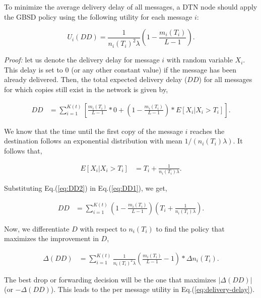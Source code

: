 \begin{theorem} \label{th:delivery-delay}
To minimize the average delivery delay of all messages, a DTN node should apply the GBSD policy using the following utility for each message $i$:

\begin{equation}\label{eq:delivery-delay}
U_{i}(DD) = \frac{1}{n_i(T_i)^2 \lambda} ( 1-\frac{m_i(T_i)}{L-1}). \end{equation}
\end{theorem}

\emph{Proof:} let us denote the delivery delay for message $i$ with random variable $X_i$. This delay is set to $0$ (or any other constant value) if the message has been already delivered. Then, the total expected delivery delay ($DD$) for all messages for which copies still exist in the network is given by,

\small
\begin{align}\label{eq:DD1}
DD & = \sum_{i=1}^{K(t)} \left[\frac{m_i(T_i)}{L-1}*0 + (1 - \frac{m_i(T_i)}{L-1}) * E[X_i | X_i
> T_i]\right].
\end{align}
\normalsize

We know that the time until the first copy of the message $i$ reaches the destination follows an exponential distribution with mean $1/(n_i(T_i)\lambda)$. It follows that,

\begin{align}\label{eq:DD2}
E[X_i | X_i
> T_i] &= T_i + \frac{1}{n_i(T_i) \lambda}.
\end{align}

Substituting Eq.(\ref{eq:DD2}) in Eq.(\ref{eq:DD1}), we get,

\begin{align*}
DD &= \sum_{i=1}^{K(t)} (1 - \frac{m_i(T_i)}{L-1})(T_i + \frac{1}{n_i(T_i)
\lambda}).
\end{align*}

Now, we differentiate $D$ with respect to $n_i(T_i)$ to find the policy that maximizes the improvement in $D$,

\begin{align*}
\Delta(DD) &= \sum_{i=1}^{K(t)}{\frac{1}{n_i(T_i)^2 \lambda} ( \frac{m_i(T_i)}{L-1}-1)* \Delta n_i(T_i)}.
\end{align*}

The best drop or forwarding decision will be the one that maximizes $\vert\Delta(DD)\vert$ (or $-\Delta(DD)$). This leads to the per message utility in Eq.(\ref{eq:delivery-delay}).

